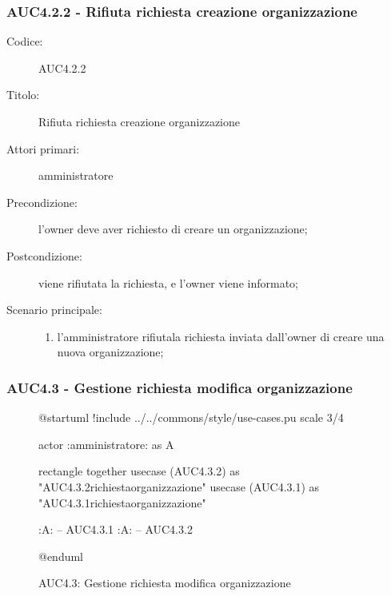 \documentclass[casi-duso]{subfiles}
\begin{document}
\subsubsection{AUC4.2.2 - Rifiuta richiesta creazione organizzazione}%
\label{subsub:AUC4.2.2}
\begin{description}
  \item[Codice:] AUC4.2.2
  \item[Titolo:] Rifiuta richiesta creazione organizzazione
  \item[Attori primari:] amministratore
  \item[Precondizione:] l'owner deve aver richiesto di creare un organizzazione;
  \item[Postcondizione:] viene rifiutata la richiesta, e l'owner viene informato;
  \item[Scenario principale:]
  \begin{enumerate}
    \item  l'amministratore rifiutala richiesta inviata dall'owner di creare una nuova organizzazione;
  \end{enumerate}
\end{description}

\subsubsection{AUC4.3 - Gestione richiesta modifica organizzazione}%
\label{subsub:AUC4.3}

\begin{figure}[h!]
  \centering
  \begin{plantuml}
  @startuml
  !include ../../commons/style/use-cases.pu
  scale 3/4

  actor :amministratore: as A

  rectangle {
    together {
      usecase (AUC4.3.2) as "AUC4.3.2\nRifiuta richiesta\nmodifica organizzazione"
      usecase (AUC4.3.1) as "AUC4.3.1\nAccetta richiesta\nmodifica organizzazione"
    }
  }

  :A: -- AUC4.3.1
  :A: -- AUC4.3.2

  @enduml
  \end{plantuml}
  \caption{AUC4.3: Gestione richiesta modifica organizzazione}
  \label{fig:auc4_3}
\end{figure}
\end{document}

